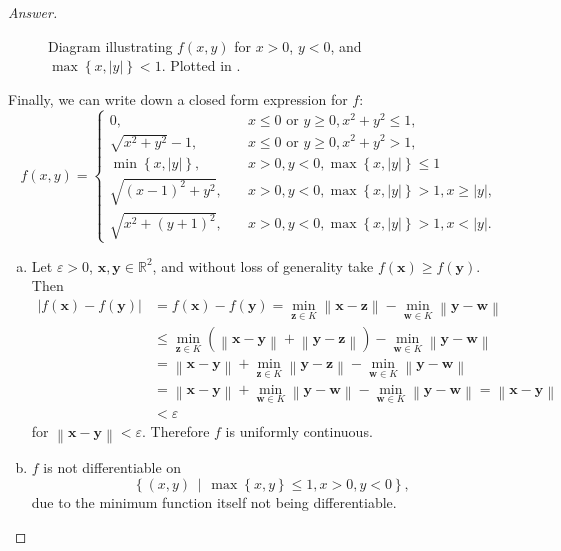 \documentclass[12pt]{article}
\newcommand{\real}{\mathbb{R}}
\newcommand\paren[1]{\left( #1 \right)}
\newcommand\setb[1]{\left \{ #1 \right \}}
\newcommand{\abs}[1]{\left | #1 \right |}
\newcommand{\norm}[1]{\left\| #1 \right\|}
\newcommand{\eps}{\varepsilon}
\theoremstyle{definition}
\begin{document}
\begin{proof}[Answer]
\begin{enumerate}
\begin{enumerate}
\begin{figure}[h]
                \caption{Diagram illustrating $f(x,y)$ for $x > 0$, $y < 0$, and $\max\setb{x,|y|} < 1$. Plotted in \cite{Desmos}.}
                \label{fig:fig4and5}
            \end{figure}
        \end{enumerate}
    \end{enumerate}
    Finally, we can write down a closed form expression for $f$:
    \[
        f(x,y) = 
        \begin{cases}
            0 , & \quad x \leq 0 \text{ or } y \geq 0 , x^2 + y^2 \leq 1, \\
            \sqrt{x^2+y^2} - 1 , & \quad x \leq 0 \text{ or } y \geq 0 , x^2 + y^2 > 1 , \\
            \min\setb{x,|y|} , & \quad x > 0 , y < 0 , \max\setb{x,|y|} \leq 1 \\
            \sqrt{(x-1)^2+y^2} , & \quad x > 0 , y < 0 , \max\setb{x,|y|} > 1 , x \geq |y| , \\
            \sqrt{x^2+(y+1)^2} , & \quad x > 0 , y < 0 , \max\setb{x,|y|} > 1 , x < |y| .
        \end{cases}
    \]
    \begin{enumerate}[a)]
        \item Let $\eps > 0$, $\mathbf{x} , \mathbf{y} \in \real^2$, and without loss of generality take $f \paren{ \mathbf{x} } \geq f \paren{ \mathbf{y} }$. Then
        \begin{align*}
            \abs{ f \paren{ \mathbf{x} } - f \paren{ \mathbf{y} } } & = f \paren{ \mathbf{x} } - f \paren{ \mathbf{y} } = \min\limits_{ \mathbf{z} \in K } \norm{ \mathbf{x} - \mathbf{z} } - \min\limits_{ \mathbf{w} \in K } \norm{ \mathbf{y} - \mathbf{w} } \\
            & \leq \min\limits_{ \mathbf{z} \in K } \paren{  \norm{ \mathbf{x} - \mathbf{y} } + \norm{ \mathbf{y} - \mathbf{z} } } - \min\limits_{ \mathbf{w} \in K } \norm{ \mathbf{y} - \mathbf{w} } \\ 
            & = \norm{ \mathbf{x} - \mathbf{y} } + \min\limits_{ \mathbf{z} \in K } \norm{ \mathbf{y} - \mathbf{z} } - \min\limits_{ \mathbf{w} \in K } \norm{ \mathbf{y} - \mathbf{w} } \\
            & = \norm{ \mathbf{x} - \mathbf{y} } + \min\limits_{ \mathbf{w} \in K } \norm{ \mathbf{y} - \mathbf{w} } - \min\limits_{ \mathbf{w} \in K } \norm{ \mathbf{y} - \mathbf{w} } = \norm{ \mathbf{x} - \mathbf{y} } \\
            & < \eps
        \end{align*}
        for $\norm{ \mathbf{x} - \mathbf{y} } < \eps$. Therefore $f$ is uniformly continuous.
        \item $f$ is not differentiable on 
        \[
            \setb{ (x,y) \, \middle| \, \max \setb{x,y} \leq 1 , x > 0 , y < 0 },
        \]
        due to the minimum function itself not being differentiable. 
    \end{enumerate}
\end{proof}
\end{document}
